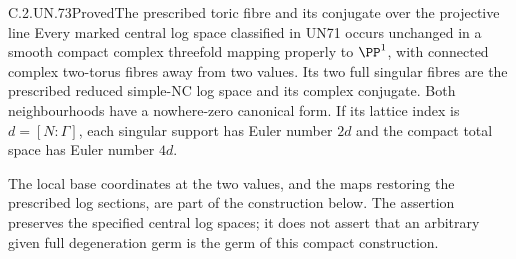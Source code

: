 \begin{statement}{C.2.UN.73}{Proved}{The prescribed toric fibre and its conjugate over the projective line}
Every marked central log space classified in UN71 occurs
unchanged in a smooth compact complex threefold mapping
properly to $\PP^1$, with connected complex two-torus
fibres away from two values. Its two full singular fibres
are the prescribed reduced simple-NC log space and its
complex conjugate. Both neighbourhoods have a nowhere-zero
canonical form. If its lattice index is $d=[N:\Gamma]$,
each singular support has Euler number $2d$ and the
compact total space has Euler number $4d$.

The local base coordinates at the two values, and the
maps restoring the prescribed log sections, are part
of the construction below. The assertion preserves
the specified central log spaces; it does not assert
that an arbitrary given full degeneration germ is
the germ of this compact construction.
\end{statement}

